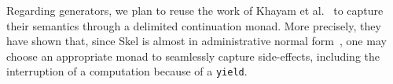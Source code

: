 \documentclass[submission,copyright,creativecommons]{eptcs}
\begin{document}
Regarding generators, we plan to reuse the work of Khayam et al.~\cite{KhayamSchmitt2023} to
capture their semantics through a delimited continuation monad. More precisely,
they have shown that, since Skel is almost in administrative normal
form~\cite{SabryFelleisen1992}, one may choose an appropriate monad to seamlessly capture
side-effects, including the interruption of a computation because of a
\texttt{yield}.

\nocite{*}


\end{document}
